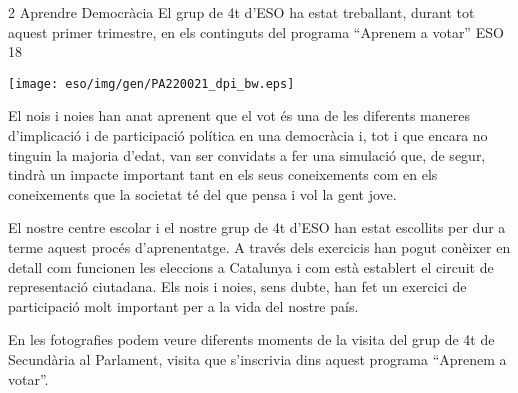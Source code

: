 %
%
\begin{news}
{2} %
{Aprendre Democràcia}
{El grup de 4t d’ESO ha estat treballant, durant tot aquest primer trimestre, en els continguts del programa “Aprenem a votar”}
{ESO}
{18} %

\noindent\texttt{[image: eso/img/gen/PA220021\_dpi\_bw.eps]}

El nois i noies han anat aprenent que el vot  és una de les diferents maneres d’implicació i de participació política en una democràcia i, tot i que encara no tinguin la majoria d’edat,  van ser convidats a fer una simulació que, de segur, tindrà un impacte important tant en els seus coneixements com en els coneixements que la societat té del que pensa i vol la gent jove.

El nostre centre escolar i el nostre grup de 4t d’ESO han estat escollits per dur a terme aquest procés d’aprenentatge. A través dels exercicis han pogut  conèixer en detall com funcionen les eleccions a Catalunya i com està establert el circuit de representació ciutadana. Els nois i noies, sens dubte,  han fet un exercici de participació molt important per a la vida del nostre país. 

En les fotografies podem veure diferents moments de la visita del grup de 4t de Secundària al Parlament, visita que s’inscrivia dins aquest programa “Aprenem a votar”.

\end{news}
